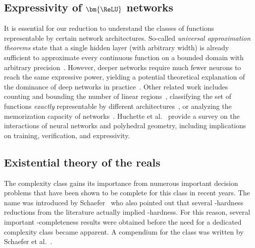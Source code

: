 \subsection{Expressivity of \texorpdfstring{$\bm{{\ReLU}}$}{ReLU} networks}
It is essential for our reduction to understand the classes of functions representable by certain \ReLU network architectures.
So-called \emph{universal approximation theorems} state that a single hidden layer (with arbitrary width) is already sufficient to approximate every continuous function on a bounded domain with arbitrary precision~\cite{Cybenko1989_Approximation, Hornik1991_Approximation}.
However, deeper networks require much fewer neurons to reach the same expressive power, yielding a potential theoretical explanation of the dominance of deep networks in practice~\cite{Arora2018_Understanding, Eldan2016_Power, Hanin2019_Universal, Hanin2018_Approximating, Liang2017_Deep, Nguyen2018_Neural, Raghu2017_Expressive, Safran2017_Depth, Telgarsky2016_Benefits, Yarotsky2017_Error}. %
Other related work includes counting and bounding the number of linear regions~\cite{Hanin2019_Complexity, Montufar2022_Sharp, Montufar2014_Regions, Pascanu2014_Number, Raghu2017_Expressive, Serra2018_Bounding,stargalla2025computational}, classifying the set of functions \emph{exactly} representable by different architectures~\cite{Arora2018_Understanding, Dereich2022_Minimal, Haase2023_LowerBound, Hertrich2021_Towards, Hertrich2021_ReLU, Mukherjee2017_Lower, Zhang2018_Tropical,bakaev2025better}, or analyzing the memorization capacity of \ReLU networks~\cite{Vardi2022_Optimal, Yun2019_Small, Zhang2021_Understanding}.
Huchette et al.~\cite{Huchette2023_Survey} provide a survey on the interactions of neural networks and polyhedral geometry, including implications on training, verification, and expressivity.



\subsection{Existential theory of the reals}
The complexity class \ER gains its importance from numerous important 
%
decision  %
problems that have been shown to be complete for this class in recent years.
The name \ER was introduced by Schaefer~\cite{Schaefer2010_GeometryTopology} who also pointed out that several \NP-hardness reductions from the literature actually implied \ER-hardness.
For this reason, several important \ER-completeness results were obtained before the need for a dedicated complexity class became apparent. A compendium for the class \ER was written by Schaefer et al.~\cite{schaefer2024existential}.

